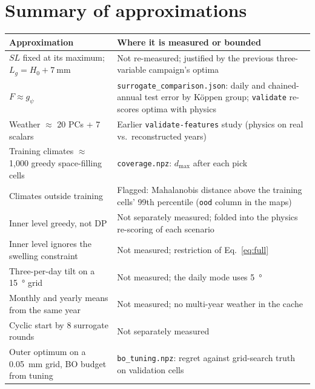 \documentclass[11pt]{article}
\newcommand{\code}[1]{\texttt{#1}}
\begin{document}
\section*{Summary of approximations}

\begin{table}[h]
\centering
\small
\begin{tabular}{@{}p{}p{}@{}}
\toprule
\textbf{Approximation} & \textbf{Where it is measured or bounded} \\
\midrule
$SL$ fixed at its maximum; $L_g = H_0 + \SI{7}{\milli\metre}$ & Not re-measured; justified by the previous three-variable campaign's optima \\
$F \approx g_\psi$ & \code{surrogate\_comparison.json}: daily and chained-annual test error by K\"oppen group; \code{validate} re-scores optima with physics \\
Weather $\approx$ 20 PCs + 7 scalars & Earlier \code{validate-features} study (physics on real vs.\ reconstructed years) \\
Training climates $\approx$ 1,000 greedy space-filling cells & \code{coverage.npz}: $d_{\max}$ after each pick \\
Climates outside training & Flagged: Mahalanobis distance above the training cells' 99th percentile (\code{ood} column in the maps) \\
Inner level greedy, not DP & Not separately measured; folded into the physics re-scoring of each scenario \\
Inner level ignores the swelling constraint & Not measured; restriction of Eq.~\eqref{eq:full} \\
Three-per-day tilt on a \SI{15}{\degree} grid & Not measured; the daily mode uses \SI{5}{\degree} \\
Monthly and yearly means from the same year & Not measured; no multi-year weather in the cache \\
Cyclic start by 8 surrogate rounds & Not separately measured \\
Outer optimum on a \SI{0.05}{\milli\metre} grid, BO budget from tuning & \code{bo\_tuning.npz}: regret against grid-search truth on validation cells \\
\bottomrule
\end{tabular}
\end{table}
\end{document}
